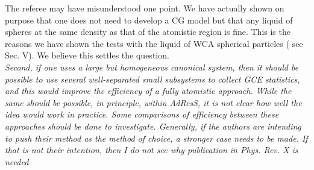 \documentclass[12pt,a4paper]{article}
\newcommand{\bluec}[1]{{\color{blue} #1}}
\begin{document}
The referee may have misunderstood one point. We have actually shown on purpose that one does not need to develop a CG model but that any liquid of spheres at the same density as that of the atomistic region is fine.
This is the reasons we have shown the tests with the liquid of WCA spherical particles (\bluec{see Sec. V}). We believe this settles the question.\\

{\color{teal} {\it Second, if one uses
a large but homogeneous canonical system, then it should be possible to use several well-separated small
subsystems to collect GCE statistics, and this would improve the efficiency of a fully atomistic approach.
While the same should be possible, in principle, within AdResS, it is not clear how well the idea would
work in practice. Some comparisons of efficiency between these approaches should be done to investigate.
Generally, if the authors are intending to push their method as the method of choice, a stronger case
needs to be made. If that is not their intention, then I do not see why publication in Phys. Rev. X is
needed}}\\
\end{document}
